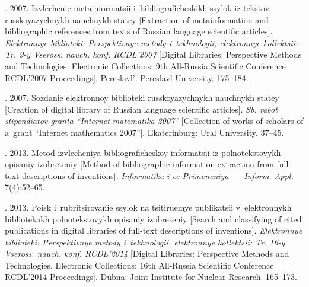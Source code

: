 \begin{multicols}{2}
{{\begin{thebibliography}{99}
. 2007. Izvlechenie
metainformatsii i~bibliograficheskikh ssylok iz tekstov russkoyazychnykh nauchnykh statey
[Extraction of metainformation and bibliographic references from texts of Russian
language scientific articles]. \textit{Elektronnye biblioteki: Perspektivnye metody
i~tekhnologii, elektronnye kollektsii: Tr. 9-y Vseross. nauch. konf. RCDL'2007} [Digital
Libraries: Perspective Methods and Technologies, Electronic Collections: 9th All-Russia
Scientific Conference RCDL'2007 Proceedings]. Pereslavl':
Pereslavl University. 175--184.


. 2007. Sozdanie elektronnoy
biblioteki russkoyazychnykh nauchnykh statey [Creation of digital library of Russian
language scientific articles]. \textit{Sb. rabot stipendiatov granta ``Internet-matematika
2007''} [Collection of works of scholars of a~grant ``Internet mathematics 2007''].
Ekaterinburg: Ural University. 37--45.

. 2013. Metod izvlecheniya
bibliograficheskoy infor\-ma\-tsii iz polnotekstovykh opisaniy izobreteniy
[Method of
bibliographic information extraction from full-text descriptions of inventions].
\textit{Informatika i ee Primeneniya}~--- \textit{Inform. Appl.} 7(4):52--65.

. 2013. Poisk i~rub\-ri\-tsirovanie ssylok na
tsitiruemye publikatsii v~elektronnykh bibliotekakh polnotekstovykh opisaniy izobreteniy
[Search and classifying of cited publications in digital libraries
of full-text descriptions of
inventions]. \textit{Elektronnye biblioteki: Perspektivnye metody i~tekhnologii, elektronnye
kollektsii: Tr. 16-y Vseross. nauch. konf.  RCDL'2014} [Digital Libraries:
Perspective
Methods and Technologies, Electronic Collections: 16th All-Russia Scientific Conference
RCDL'2014 Proceedings]. Dubna: Joint Institute for Nuclear Research. 165--173.


\end{thebibliography}}}
\end{multicols}

